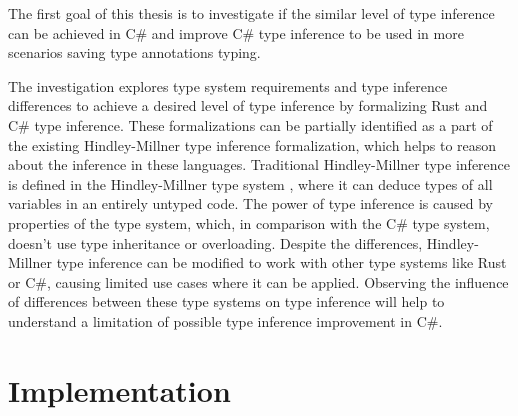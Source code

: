 The first goal of this thesis is to investigate if the similar level of type inference can be achieved in C\# and improve C\# type inference to be used in more scenarios saving type annotations typing.
\par
The investigation explores type system requirements and type inference differences to achieve a desired level of type inference by formalizing Rust and C\# type inference.
These formalizations can be partially identified as a part of the existing Hindley-Millner \cite{online:yHM} type inference formalization, which helps to reason about the inference in these languages.
Traditional Hindley-Millner type inference is defined in the Hindley-Millner type system \cite{online:wikiHM}, where it can deduce types of all variables in an entirely untyped code. 
The power of type inference is caused by properties of the type system, which, in comparison with the C\# type system, doesn't use type inheritance or overloading. 
Despite the differences, Hindley-Millner type inference can be modified to work with other type systems like Rust or C\#, causing limited use cases where it can be applied.
Observing the influence of differences between these type systems on type inference will help to understand a limitation of possible type inference improvement in C\#.

\section{Implementation}

